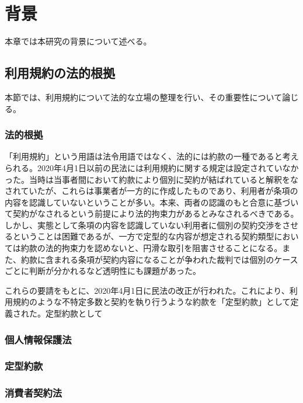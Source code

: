 \chapter{背景}
\label{background}
本章では本研究の背景について述べる。

\section{利用規約の法的根拠}
本節では、利用規約について法的な立場の整理を行い、その重要性について論じる。

\subsection{法的根拠}
「利用規約」という用語は法令用語ではなく、法的には約款の一種であると考えられる\cite{itakura2013}。2020年4月1日以前の民法には利用規約に関する規定は設定されていなかった。当時は当事者間において約款により個別に契約が結ばれていると解釈をなされていたが、これらは事業者が一方的に作成したものであり、利用者が条項の内容を認識していないということが多い。本来、両者の認識のもと合意に基づいて契約がなされるという前提により法的拘束力があるとみなされるべきである。しかし、実態として条項の内容を認識していない利用者に個別の契約交渉をさせるということは困難であるが、一方で定型的な内容が想定される契約類型においては約款の法的拘束力を認めないと、円滑な取引を阻害させることになる。また、約款に含まれる条項が契約内容になることが争われた裁判では個別のケースごとに判断が分かれるなど透明性にも課題があった\cite{hashimoto2021}。

これらの要請をもとに、2020年4月1日に民法の改正が行われた\cite{moj2020minpo}。これにより、利用規約のような不特定多数と契約を執り行うような約款を「定型約款」として定義された。定型約款として

\subsection{個人情報保護法}

\subsection{定型約款}

\subsection{消費者契約法}


